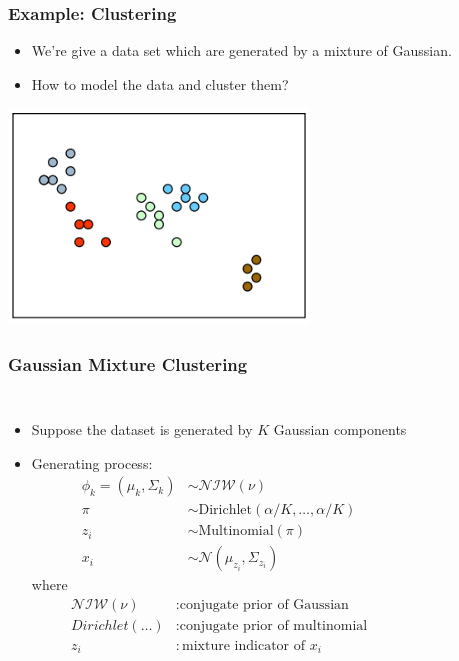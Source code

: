 \documentclass{beamer}
\begin{document}
\begin{frame}
	\frametitle{Example: Clustering}
	\begin{itemize}
		\item We're give a data set which are generated by a mixture of Gaussian.
		\item How to model the data and cluster them?
	\end{itemize}
	\centering
	\includegraphics[width=0.6\textwidth]{img/motive.png}
\end{frame}

\begin{frame}
	\frametitle{Gaussian Mixture Clustering}
	
	\begin{columns}
		\begin{itemize}
			
			\item Suppose the dataset is generated by $K$ Gaussian components 
			\item Generating process:
			\begin{align*}
			\phi_k = (\mu_k, \Sigma_k) & \sim \mathcal{NIW}(\nu) \\
			\pi & \sim \text{Dirichlet}(\alpha/K, \ldots, \alpha/K) \\
			z_i & \sim \text{Multinomial}(\pi) \\
			x_i & \sim \mathcal{N}(\mu_{z_i}, \Sigma_{z_i})
			\end{align*}
			where 
			\begin{align*}
			\mathcal{NIW}(\nu) & : \text{conjugate prior of Gaussian} \\
			Dirichlet(\ldots) & : \text{conjugate prior of multinomial} \\
			z_i & : \text{mixture indicator of } x_i
			\end{align*}
		\end{itemize}
		\centering
	\end{columns}
\end{frame}
\end{document}
